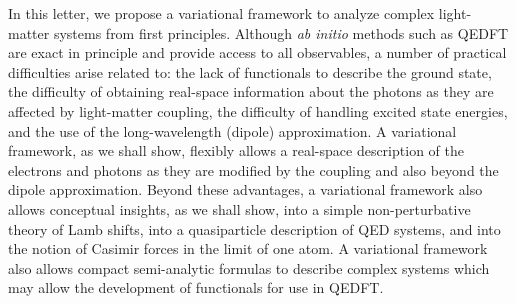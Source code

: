 \documentclass[aps,prl,twocolumn,
	groupedaddress,superscriptaddress,
	amsfonts,amssymb,amsmath,floatfix,
	citeautoscript]{revtex4-1}
\begin{document}
In this letter, we propose a variational framework to analyze complex light-matter systems from first principles. Although  \textit{ab initio} methods such as QEDFT are exact in principle and provide access to all observables, a number of practical difficulties arise related to: the lack of functionals to describe the ground state, the difficulty of obtaining real-space information about the photons as they are affected by light-matter coupling, the difficulty of handling excited state energies, and the use of the long-wavelength (dipole) approximation. A variational framework, as we shall show, flexibly allows a real-space description of the electrons and photons as they are modified by the coupling and also beyond the dipole approximation. Beyond these advantages, a variational framework also allows conceptual insights, as we shall show, into a simple non-perturbative theory of Lamb shifts, into a quasiparticle description of QED systems, and into the notion of Casimir forces in the limit of one atom. A variational framework also allows compact semi-analytic formulas to describe complex systems which may allow the development of functionals for use in QEDFT.
\end{document}
